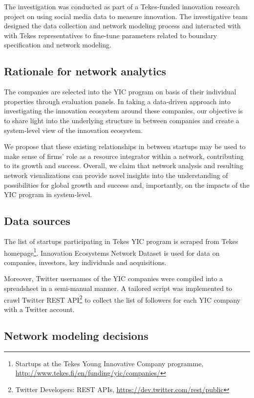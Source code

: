 The investigation was conducted as part of a Tekes-funded innovation research project on using social media data to measure innovation. The investigative team designed the data collection and network modeling process and interacted with with Tekes representatives to fine-tune parameters related to boundary specification and network modeling.  

\subsection{Rationale for network analytics}

The companies are selected into the YIC program on basis of their individual properties through evaluation panels. In taking a data-driven approach into investigating the innovation ecosystem around these companies, our objective is to share light into the underlying structure in between companies and create a system-level view of the innovation ecosystem. 

We propose that these existing relationships in between startups may be used to make sense of firms' role as a resource integrator within a network, contributing to its growth and success. Overall, we claim that network analysis and resulting network visualizations can provide novel insights into the understanding of possibilities for global growth and success and, importantly, on the impacts of the YIC program in system-level.

\subsection{Data sources}

The list of startups participating in Tekes YIC program is scraped from Tekes homepage\footnote{Startups at the Tekes Young Innovative Company programme, \url{http://www.tekes.fi/en/funding/yic/companies/}}. Innovation Ecosystems Network Dataset \citep{Rubens2010LeveragingMoves} is used for data on  companies, investors, key individuals and acquisitions. 

Moreover, Twitter usernames of the YIC companies were compiled into a spreadsheet in a semi-manual manner. A tailored script was implemented to crawl Twitter REST API\footnote{Twitter Developers: REST APIs, \url{https://dev.twitter.com/rest/public}} to collect the list of followers for each YIC company with a Twitter account.

\subsection{Network modeling decisions}

